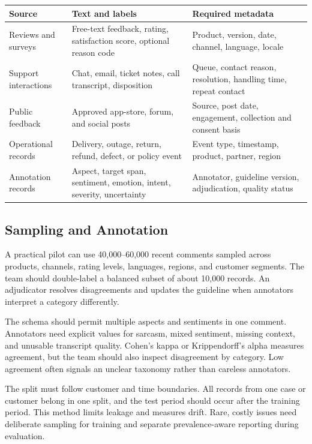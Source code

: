 \documentclass[11pt,a4paper,twoside]{article}
\begin{document}
\begin{tabularx}{\textwidth}{|>{\raggedright\arraybackslash}p{2.75cm}|Y|Y|}
\hline
\textbf{Source} & \textbf{Text and labels} & \textbf{Required metadata} \\ \hline
Reviews and surveys & Free-text feedback, rating, satisfaction score, optional reason code & Product, version, date, channel, language, locale \\ \hline
Support interactions & Chat, email, ticket notes, call transcript, disposition & Queue, contact reason, resolution, handling time, repeat contact \\ \hline
Public feedback & Approved app-store, forum, and social posts & Source, post date, engagement, collection and consent basis \\ \hline
Operational records & Delivery, outage, return, refund, defect, or policy event & Event type, timestamp, product, partner, region \\ \hline
Annotation records & Aspect, target span, sentiment, emotion, intent, severity, uncertainty & Annotator, guideline version, adjudication, quality status \\ \hline
\end{tabularx}

\subsection{Sampling and Annotation}

A practical pilot can use 40,000--60,000 recent comments sampled across products, channels, rating levels, languages, regions, and customer segments. The team should double-label a balanced subset of about 10,000 records. An adjudicator resolves disagreements and updates the guideline when annotators interpret a category differently.

The schema should permit multiple aspects and sentiments in one comment. Annotators need explicit values for sarcasm, mixed sentiment, missing context, and unusable transcript quality. Cohen's kappa or Krippendorff's alpha measures agreement, but the team should also inspect disagreement by category. Low agreement often signals an unclear taxonomy rather than careless annotators.

The split must follow customer and time boundaries. All records from one case or customer belong in one split, and the test period should occur after the training period. This method limits leakage and measures drift. Rare, costly issues need deliberate sampling for training and separate prevalence-aware reporting during evaluation.
\end{document}
